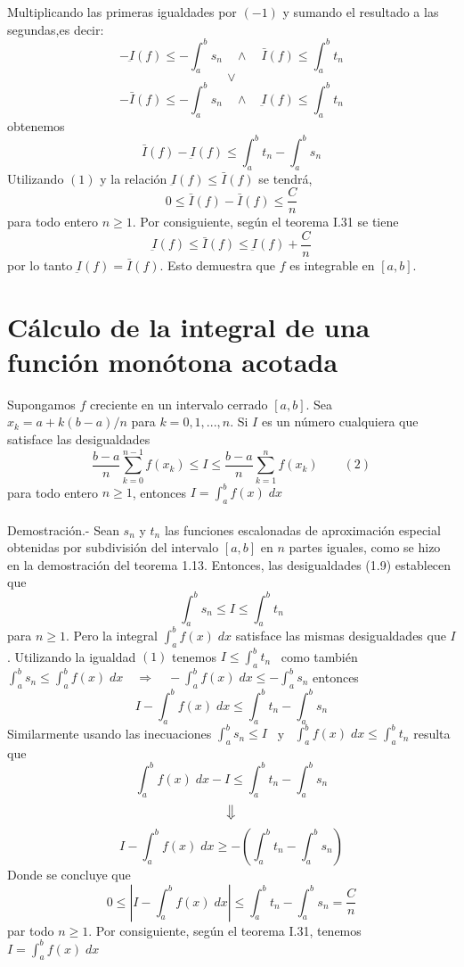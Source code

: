 \begin{multicols}{2}
\begin{teo}
    Multiplicando las primeras igualdades por $(-1)$ y sumando el resultado a las segundas,es decir: $$-\underbar{I}(f)\leq - \int_a^b s_n\quad \land\quad \bar{I}(f) \leq \int_a^b t_n$$ $$\lor$$ $$-\bar{I}(f)\leq -\int_a^b s_n \quad \land\quad \underbar{I}(f)\leq \int_a^b t_n$$ obtenemos $$\bar{I}(f)-\underbar{I}(f) \leq \int_a^b t_n - \int_a^b s_n$$ 
    Utilizando $(1)$ y la relación $\underbar{I}(f) \leq \bar{I}(f)$ se tendrá, $$0\leq \bar{I}(f) - \bar{I}(f) \leq \dfrac{C}{n}$$
    para todo entero $n\geq 1$. Por consiguiente, según el teorema I.31 se tiene $$\underbar{I}(f)\leq \bar{I}(f)\leq \underbar{I}(f) + \dfrac{C}{n}$$
    por lo tanto $\underbar{I}(f)=\bar{I}(f)$. Esto demuestra que $f$ es integrable en $[a,b]$.
\end{teo}


\section*{Cálculo de la integral de una función monótona acotada}

\begin{teo} Supongamos $f$ creciente en un intervalo cerrado $[a,b]$. Sea $x_k = a + k(b-a)/n$ para $k=0,1,...,n$. Si $I$ es un número cualquiera que satisface las desigualdades $$\dfrac{b-a}{n}\sum\limits_{k=0}^{n-1} f(x_k)\leq I \leq \dfrac{b-a}{n}\sum\limits_{k=1}^n f(x_k) \qquad (2)$$
    para todo entero $n\geq 1$, entonces $I=\int_a^b f(x) \; dx$\\\\
    Demostración.-\; Sean $s_n$ y $t_n$ las funciones escalonadas de aproximación especial obtenidas por subdivisión del intervalo $[a,b]$ en $n$ partes iguales, como se hizo en la demostración del teorema 1.13. Entonces, las desigualdades (1.9) establecen que $$\int_a^b s_n \leq I \leq \int_a^b t_n$$
    para $n\geq 1$. Pero la integral $\int_a^b f(x) \; dx$ satisface las mismas desigualdades que $I$. Utilizando la igualdad $(1)$ tenemos $I\leq \int_a^b t_n$ \, como también \, $\int_a^b s_n \leq \int_a^b f(x) \; dx \quad \Longrightarrow\quad  - \int_a^b f(x) \; dx \leq -\int_a^b s_n$ entonces $$I-\int_a^b f(x)\; dx \leq \int_a^b t_n - \int_a^b s_n$$
    Similarmente usando las inecuaciones $\int_a^b s_n \leq I$ \, y \, $\int_a^b f(x) \; dx \leq \int_a^b t_n$ resulta que $$\int_a^b f(x) \; dx - I \leq \int_a^b t_n - \int_a^b s_n $$ $$\big\Downarrow$$ $$  I - \int_a^b f(x) \; dx \geq - \left(\int_a^b t_n - \int_a^b s_n\right)$$ 
    Donde se concluye que $$0\leq \left| I - \int_a^b f(x) \; dx \right| \leq \int_a^b t_n - \int_a^b s_n = \dfrac{C}{n}$$
    par todo $n\geq 1$. Por consiguiente, según el teorema I.31, tenemos $I=\int_a^b f(x) \; dx$\\\\
\end{teo}


\end{multicols}
